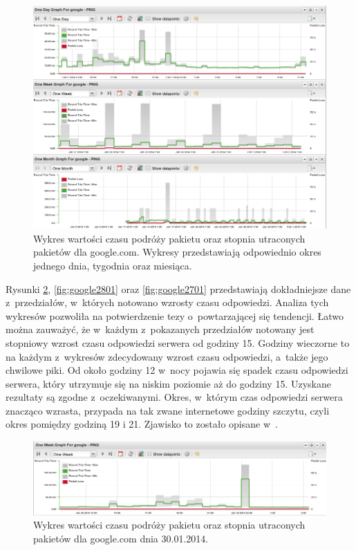 \begin{figure}[ht]
  \caption{Wykres wartości czasu podróży pakietu oraz stopnia
    utraconych pakietów dla google.com.  Wykresy przedstawiają
    odpowiednio okres jednego dnia, tygodnia oraz miesiąca.}
  \label{fig:pingiGoogle}
  \centering
\includegraphics[width=1\textwidth]{img/pingiGoogle.png}
\end{figure}


Rysunki \ref{fig:google3001}, \ref{fig:google2801} oraz
\ref{fig:google2701} przedstawiają dokładniejsze dane z~przedziałów,
w~których notowano wzrosty czasu odpowiedzi. Analiza tych wykresów
pozwoliła na potwierdzenie tezy o~powtarzającej się tendencji. Łatwo
można zauważyć, że w~każdym z~pokazanych przedziałów notowany jest
stopniowy wzrost czasu odpowiedzi serwera od godziny 15. Godziny
wieczorne to na każdym z~wykresów zdecydowany wzrost czasu odpowiedzi,
a~także jego chwilowe piki. Od około godziny 12 w~nocy pojawia się
spadek czasu odpowiedzi serwera, który utrzymuje się na niskim
poziomie aż do godziny 15. Uzyskane rezultaty są zgodne
z~oczekiwanymi. Okres, w~którym czas odpowiedzi serwera znacząco
wzrasta, przypada na tak zwane internetowe godziny szczytu, czyli
okres pomiędzy godziną 19 i 21. Zjawisko to zostało opisane
w~\cite{www:RushHours}.


\begin{figure}[H]
  \caption{Wykres wartości czasu podróży pakietu oraz stopnia
    utraconych pakietów dla google.com dnia 30.01.2014.}
  \label{fig:google3001}
  \centering
\includegraphics[width=1\textwidth]{img/google3001.png}
\end{figure}

